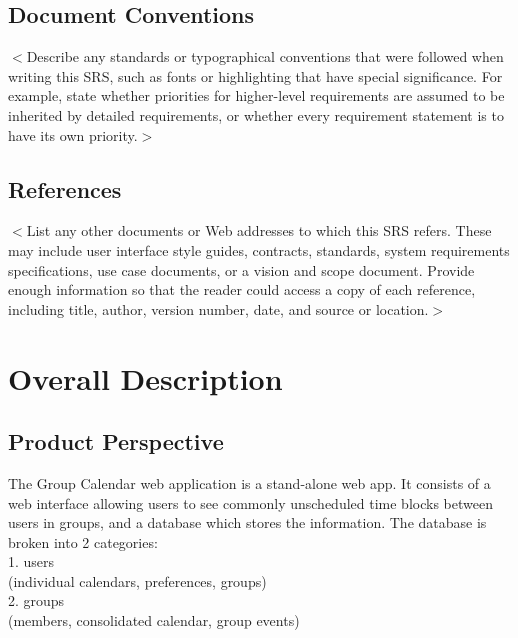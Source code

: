 \documentclass{scrreprt}
\begin{document}
\section{Document Conventions}
$<$Describe any standards or typographical conventions that were followed when
writing this SRS, such as fonts or highlighting that have special significance.
For example, state whether priorities  for higher-level requirements are assumed
to be inherited by detailed requirements, or whether every requirement statement
is to have its own priority.$>$


\section{References}
$<$List any other documents or Web addresses to which this SRS refers. These may
include user interface style guides, contracts, standards, system requirements
specifications, use case documents, or a vision and scope document. Provide
enough information so that the reader could access a copy of each reference,
including title, author, version number, date, and source or location.$>$


\chapter{Overall Description}

\section{Product Perspective}
The Group Calendar web application is a stand-alone web app. It consists of a
web interface allowing users to see commonly unscheduled time blocks between
users in groups, and a database which stores the information. The database is
broken into 2 categories:
\\1. users
\\  (individual calendars, preferences, groups)
\\2. groups
\\  (members, consolidated calendar, group events)
\end{document}
